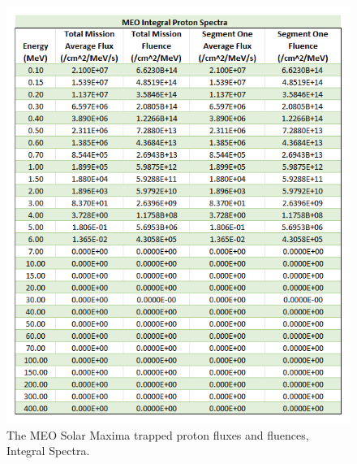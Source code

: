 \documentclass[11pt]{article}
\begin{document}
\begin{figure}[H]
    \centering
    \begin{minipage}{\dimexpr.5\textwidth-1em}
        \centering
        \includegraphics[width=1\linewidth]{MEO_TPSM_PS.png}
        \caption{The MEO Solar Maxima trapped proton fluxes and fluences, Integral Spectra.}
        \label{fig:OHBMEOIPS}
    \end{minipage}\hfill
    \begin{minipage}{\dimexpr.5\textwidth-1em}
        \centering

\end{minipage}
\end{figure}
\end{document}
